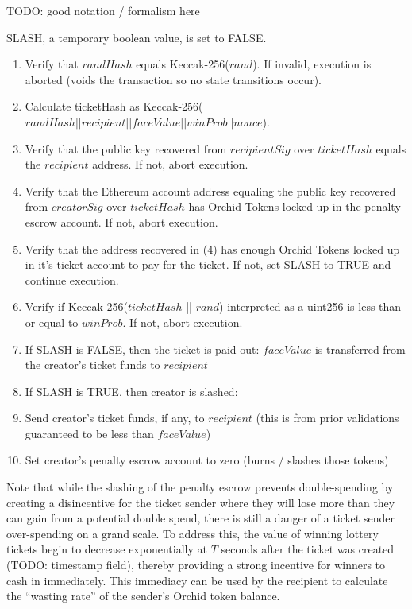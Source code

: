 TODO: good notation / formalism here

SLASH, a temporary boolean value, is set to FALSE.

\begin{enumerate}
\item Verify that $randHash$ equals Keccak-256($rand$). If invalid, execution is aborted (voids the transaction so no state transitions occur).
\item Calculate ticketHash as Keccak-256($randHash || recipient || faceValue || winProb || nonce$).
\item Verify that the public key recovered from $recipientSig$ over $ticketHash$ equals the $recipient$ address. If not, abort execution.
\item Verify that the Ethereum account address equaling the public key recovered from $creatorSig$ over $ticketHash$ has Orchid Tokens locked up in the penalty escrow account. If not, abort execution.
\item Verify that the address recovered in (4) has enough Orchid Tokens locked up in it's ticket account to pay for the ticket. If not, set SLASH to TRUE and continue execution.
\item Verify if Keccak-256($ticketHash$ || $rand$) interpreted as a uint256 is less than or equal to $winProb$. If not, abort execution.
\item If SLASH is FALSE, then the ticket is paid out: $faceValue$ is transferred from the creator's ticket funds to $recipient$
\item If SLASH is TRUE, then creator is slashed:
\item Send creator's ticket funds, if any, to $recipient$ (this is from prior validations guaranteed to be less than $faceValue$)
\item Set creator's penalty escrow account to zero (burns / slashes those tokens)
\end{enumerate}

Note that while the slashing of the penalty escrow prevents double-spending by creating a disincentive for the ticket sender where they will lose more than they can gain from a potential double spend, there is still a danger of a ticket sender over-spending on a grand scale. To address this, the value of winning lottery tickets begin to decrease exponentially at $T$ seconds after the ticket was created (TODO: timestamp field), thereby providing a strong incentive for winners to cash in immediately. This immediacy can be used by the recipient to calculate the ``wasting rate'' of the sender's Orchid token balance.


